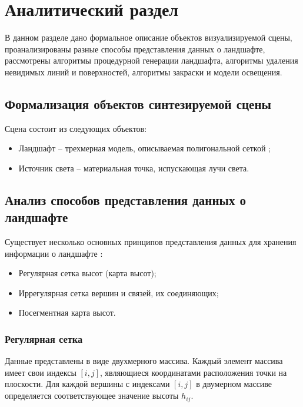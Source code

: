 \chapter{Аналитический раздел}

В данном разделе дано формальное описание объектов визуализируемой сцены, проанализированы разные способы представления данных о ландшафте, рассмотрены алгоритмы процедурной генерации ландшафта, алгоритмы удаления невидимых линий и поверхностей, алгоритмы закраски и модели освещения.

\section{Формализация объектов синтезируемой сцены}

Сцена состоит из следующих объектов:

\begin{itemize}[label=--]
	\item Ландшафт -- трехмерная модель, описываемая полигональной сеткой \cite{lands};
	\item Источник света -- материальная точка, испускающая лучи света.
\end{itemize}

\section{Анализ способов представления данных о ландшафте}

Существует несколько основных принципов представления данных для хранения информации о ландшафте \cite{datalands}:

\begin{itemize}[label=--]
	\item Регулярная сетка высот (карта высот);
	\item Иррегулярная сетка вершин и связей, их соединяющих;
	\item Посегментная карта высот.
\end{itemize}

\subsection{Регулярная сетка}

Данные представлены в виде двухмерного массива. Каждый элемент массива имеет свои индексы $[i, j]$, являющиеся координатами расположения точки на плоскости.  Для каждой вершины с индексами $[i, j]$ в двумерном массиве определяется соответствующее значение высоты $h_{ij}$.

